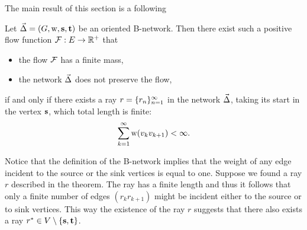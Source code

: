 \documentclass[12pt]{article}
\begin{document}
    The main result of this section is a following
    \begin{theorem}
      \label{ray-thm}
      Let $\vec{\Delta} = (G, \mathrm{w}, \mathbf{s}, \mathbf{t})$ be an oriented B-network.
      Then there exist such a positive flow function $\mathcal{F}: E \to \mathbb{R}^{+}$ that
      \begin{itemize}
        \item the flow $\mathcal{F}$ has a finite mass,
        \item the network $\vec{\Delta}$ does not preserve the flow,
      \end{itemize}
        if and only if there exists a ray $r = \{{r}_n\}_{n=1}^\infty$ in the network $\vec{\Delta}$, taking its start in the vertex $\mathbf{s}$,
          which total length is finite:
        \[
          \sum_{k=1}^\infty \mathrm{w}(v_k v_{k+1}) < \infty.
        \]
    \end{theorem}
    \begin{remark}
      \label{inner-ray-rmk}
      Notice that the definition of the B-network implies that the weight of any edge
        incident to the source or the sink vertices is equal to one.
      Suppose we found a ray $r$ described in the theorem.
      The ray has a finite length and thus it follows that only a finite number of edges $(r_k r_{k+1})$ might
        be incident either to the source or to sink vertices.
      This way the existence of the ray $r$ suggests that there also exists a ray $r^* \in V \setminus \left\{\mathbf{s}, \mathbf{t}\right\}$.
    \end{remark}
\end{document}

